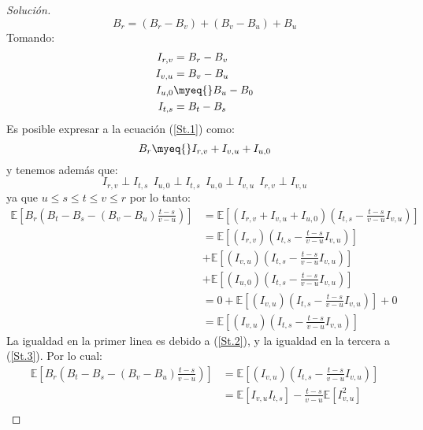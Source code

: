 \documentclass[11pt,notitlepage]{article}
\newenvironment{solucion}
  {\begin{proof}[Solución]}
  {\end{proof}}
\begin{document}
\begin{enumerate}
\begin{solucion}
    \begin{equation}\label{St.1}
        B_r = (B_r - B_v) + (B_v - B_u) + B_u 
    \end{equation}
    Tomando: 
    \begin{align*}
        I_{r,v} &= B_r - B_v\\
        I_{v,u} &= B_v - B_u\\
        I_{u,0} &\myeq{} B_u - B_0\\
        I_{t,s} &= B_t - B_s
    \end{align*}
    Es posible expresar a la ecuación (\ref{St.1}) como: 
    \begin{equation}\label{St.2}
        B_r \myeq{}  I_{r,v} + I_{v,u} + I_{u,0}
    \end{equation}
    y tenemos además que: 
    \begin{equation}\label{St.3}
    I_{r,v} \perp I_{t,s} \ \ I_{u,0} \perp I_{t,s} \ \ I_{u,0} \perp I_{v,u} \ \ I_{r,v} \perp I_{v,u}
    \end{equation}
    \[\]
    ya que \(u \leq s \leq t \leq v \leq r\) por lo tanto: 
    \begin{align*}
        \mathbb{E}\left[B_r\left( B_t -B_s -(B_v -B_u)\frac{t-s}{v-u}\right)\right] &=  \mathbb{E}\left[\left(I_{r,v} + I_{v,u} + I_{u,0}\right)\left(  I_{t,s} - \frac{t-s}{v-u}I_{v,u}\right)\right]\\ 
        &= \mathbb{E}\left[\left(I_{r,v}\right)\left(I_{t,s} - \frac{t-s}{v-u}I_{v,u}\right)\right]\\
        &+ \mathbb{E}\left[\left( I_{v,u}\right)\left(I_{t,s} - \frac{t-s}{v-u}I_{v,u}\right)\right]\\
        &+ \mathbb{E}\left[\left( I_{u,0}\right)\left(I_{t,s} - \frac{t-s}{v-u}I_{v,u}\right)\right]\\
        &= 0 + \mathbb{E}\left[\left( I_{v,u}\right)\left(I_{t,s} - \frac{t-s}{v-u}I_{v,u}\right)\right] + 0\\
        &=\mathbb{E}\left[\left( I_{v,u}\right)\left(I_{t,s} - \frac{t-s}{v-u}I_{v,u}\right)\right]
    \end{align*}
    La igualdad en la primer linea es debido a (\ref{St.2}), y la igualdad en la tercera a (\ref{St.3}). Por lo cual: 
    \begin{align*}
        \mathbb{E}\left[B_r\left( B_t -B_s -(B_v -B_u)\frac{t-s}{v-u}\right)\right] &= \mathbb{E}\left[\left( I_{v,u}\right)\left(I_{t,s} - \frac{t-s}{v-u}I_{v,u}\right)\right]\\
        &= \mathbb{E}\left[I_{v,u}I_{t,s}\right]-\frac{t-s}{v-u}\mathbb{E}\left[I_{v,u}^2\right]\\

\end{align*}
\end{solucion}
\end{enumerate}
\end{document}
